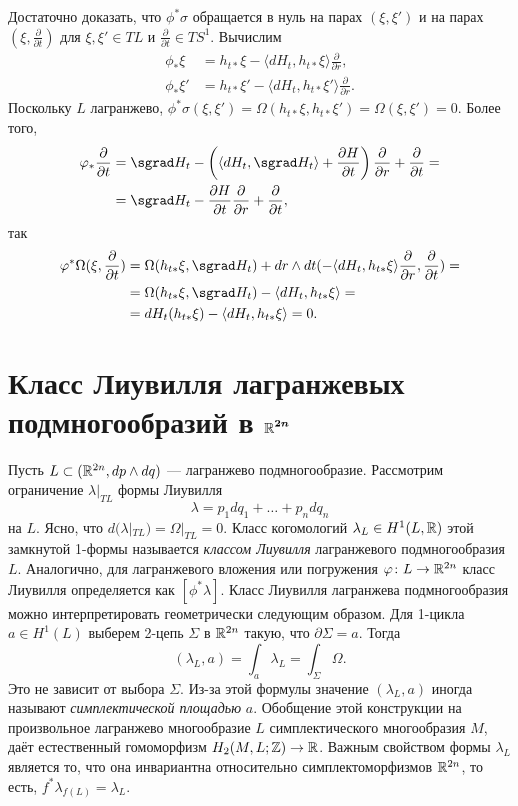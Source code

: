 Достаточно доказать, что $\phi^\ast \sigma$ обращается в нуль на парах $(\xi, \xi')$ и на парах  $(\xi, \tfrac{\partial}{\partial t})$ для $\xi, \xi' \in T L$ и $\tfrac{\partial}{\partial t} \in T S^1$.
Вычислим 
\begin{align*}
\phi_\ast \xi
&= h_{t\ast} \xi - \langle dH_t, h_{t\ast} \xi\rangle
\frac{\partial}{\partial r},
\\
\phi_\ast \xi'
&= h_{t\ast} \xi' - \langle dH_t, h_{t\ast} \xi'\rangle
\frac{\partial}{\partial r}.
\end{align*}
Поскольку $L$ лагранжево, $\phi^\ast \sigma (\xi, \xi') = \Omega (h_{t\ast} \xi, h_{t\ast} \xi') = \Omega (\xi, \xi') = 0$.
Более того,
\begin{align*}
\phi_\ast\frac{\partial}{\partial t}
&= \sgrad H_t - 
\left( \langle dH_t, \sgrad H_t \rangle +\frac{\partial H}{\partial t}\right) \frac{\partial}{\partial r} +\frac{\partial}{\partial t}=
\\
&=\sgrad H_t - \frac{\partial H}{\partial t}\frac{\partial}{\partial r} +\frac{\partial}{\partial t},
\end{align*}
так 
\begin{align*}
\phi^\ast \Omega (\xi, \frac{\partial}{\partial t})
&= \Omega (h_{t\ast} \xi, \sgrad H_t) + dr \wedge dt (-\langle dH_t, h_{t\ast} \xi\rangle \frac{\partial}{\partial r},\frac{\partial}{\partial t}) =
\\
&=\Omega (h_{t\ast} \xi, \sgrad H_t) - \langle dH_t, h_{t\ast} \xi\rangle =
\\
&=dH_t (h_{t\ast} \xi) - \langle dH_t, h_{t\ast} \xi\rangle = 0.
\end{align*}
\qeds

\section[Класс Лиувилля лагранжевых подмногообразий в $\RR^{2n}$]{Класс Лиувилля лагранжевых подмногообразий в $\bm{\mathbb{R}^{2n}}$}

Пусть $L \subset (\mathbb{R}^{2n}, dp \wedge dq)$ --- лагранжево подмногообразие.
Рассмотрим ограничение $\lambda|_{TL}$ формы Лиувилля 
\[\lambda = p_1 dq_1+\dots+ p_n dq_n\]
на $L$.
Ясно, что $d (\lambda|_{TL}) = \Omega|_{TL} = 0$.
Класс когомологий $\lambda_L \in H^1 (L, \mathbb{R})$ этой замкнутой 1-формы называется \emph{классом Лиувилля} лагранжевого подмногообразия $L$.
Аналогично, для лагранжевого вложения или погружения $\varphi\colon L \to \mathbb{R}^{2n}$ класс Лиувилля определяется как $[\phi^\ast \lambda]$.
Класс Лиувилля лагранжева подмногообразия можно интерпретировать геометрически следующим образом.
Для 1-цикла $a\in H^1 (L)$ выберем 2-цепь $\Sigma$ в $\RR^{2n}$ такую, что $\partial\Sigma = a$.
Тогда
\[(\lambda_L, a) = \int_a\lambda_L = \int_\Sigma\Omega.\]
Это  не зависит от выбора $\Sigma$.
Из-за этой формулы значение $(\lambda_L, a)$ иногда называют \emph{симплектической площадью} $a$.
Обобщение этой конструкции на произвольное лагранжево многообразие $L$ симплектического многообразия $M$, даёт естественный гомоморфизм $H_2 (M, L; \mathbb{Z}) \to \mathbb{R}$.
Важным свойством формы $\lambda_L$ является то, что она инвариантна относительно симплектоморфизмов $\RR^{2n}$,
то есть,
$f^\ast \lambda_{f (L)} = \lambda_L$.

